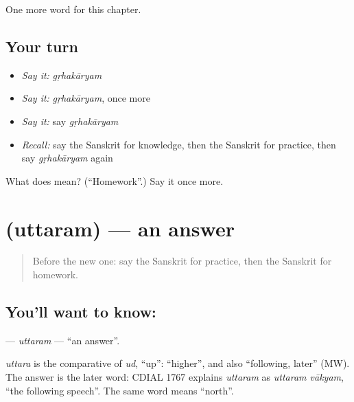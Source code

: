 \begin{grammarlens}[title={What you've built}]
One more word for this chapter.
\end{grammarlens}

\subsection*{Your turn}
\begin{itemize}
\raggedright
  \item \emph{Say it:} \emph{gṛhakāryam}
  \item \emph{Say it:} \emph{gṛhakāryam}, once more
  \item \emph{Say it:} say \emph{gṛhakāryam}
  \item \emph{Recall:} say the Sanskrit for knowledge, then the Sanskrit for practice, then say \emph{gṛhakāryam} again
\end{itemize}

\begin{tcolorbox}[breakable,colback=teal!4,colframe=teal!35!black,title={Before you move on}]
What does  mean? (\textquotedblleft{}Homework\textquotedblright{}.) Say it once more.
\end{tcolorbox}
\section[\texorpdfstring{\sk{उत्तरम्} (uttaram)}{उत्तरम् (uttaram)}]{ (uttaram) — an answer}

\label{lesson:SA-C255-uttaram}



\begin{quote}
Before the new one: say the Sanskrit for practice, then the Sanskrit for homework.
\end{quote}

\subsection*{You'll want to know: }
\textbf{} — \emph{uttaram} — \textquotedblleft{}an answer\textquotedblright{}.

\begin{cousinweb}
\emph{uttara} is the comparative of \emph{ud}, \textquotedblleft{}up\textquotedblright{}: \textquotedblleft{}higher\textquotedblright{}, and also \textquotedblleft{}following, later\textquotedblright{} (MW). The answer is the later word: CDIAL 1767 explains \emph{uttaram} as \emph{uttaram vākyam}, \textquotedblleft{}the following speech\textquotedblright{}. The same word means \textquotedblleft{}north\textquotedblright{}.
\end{cousinweb}

